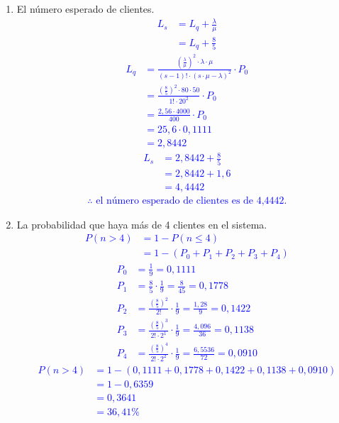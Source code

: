 \documentclass{templateNote}
\begin{document}
\begin{enumerate}
    \newpage
    \item El número esperado de clientes.
    \textcolor{blue}{
        \begin{align*}
            L_s &= L_q + \frac{\lambda}{\mu} \\
            &= L_q + \frac{8}{5}
        \end{align*}
        \begin{align*}
            L_q &= \frac{\displaystyle\left(\frac{\lambda}{\mu}\right)^2 \cdot \lambda \cdot \mu}{(s - 1)! \cdot (s \cdot \mu - \lambda)^2} \cdot P_0 \\
            &= \frac{\displaystyle\left(\frac{8}{5}\right)^2 \cdot 80 \cdot 50}{1! \cdot 20^2} \cdot P_0 \\
            &= \frac{2,56 \cdot 4000}{400} \cdot P_0 \\
            &= 25,6 \cdot 0,1111 \\
            &= 2,8442
        \end{align*}
        \begin{align*}
            L_s &= 2,8442 + \frac{8}{5} \\
            &= 2,8442 + 1,6 \\
            &= 4,4442
        \end{align*}
        \begin{align*}
            \therefore \text{ el número esperado de clientes es de 4,4442.}
        \end{align*}
    }
    \item La probabilidad que haya más de 4 clientes en el sistema. \newline
    \textcolor{blue}{
        \begin{align*}
            P(n > 4) &= 1 - P(n \leq 4) \\
            &= 1 - (P_0 + P_1 + P_2 + P_3 + P_4)
        \end{align*}
        \begin{align*}
            P_0 &= \frac{1}{9} = 0,1111 \\
            P_1 &= \frac{8}{5} \cdot \frac{1}{9} = \frac{8}{45} = 0,1778 \\
            P_2 &= \frac{\left(\frac{8}{5}\right)^2}{2!} \cdot \frac{1}{9} = \frac{1,28}{9} = 0,1422 \\
            P_3 &= \frac{\left(\frac{8}{5}\right)^3}{2! \cdot 2^1} \cdot \frac{1}{9} = \frac{4,096}{36} = 0,1138 \\
            P_4 &= \frac{\left(\frac{8}{5}\right)^4}{2! \cdot 2^2} \cdot \frac{1}{9} = \frac{6,5536}{72} = 0,0910
        \end{align*}
        \begin{align*}
            P(n > 4) &= 1 - (0,1111 + 0,1778 + 0,1422 + 0,1138 + 0,0910) \\
            &= 1 - 0,6359 \\
            &= 0,3641 \\
            &= 36,41\%
        \end{align*}
    }
\end{enumerate}
\end{document}
